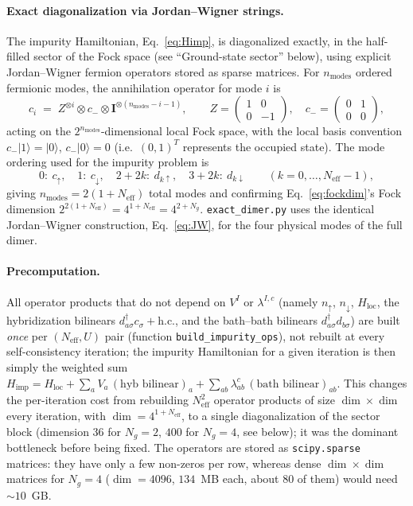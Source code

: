 \documentclass[11pt]{article}
\newcommand{\Neff}{N_{\mathrm{eff}}}
\newcommand{\Ng}{N_{g}}
\newcommand{\Himp}{H_{\mathrm{imp}}}
\newcommand{\Hloc}{H_{\mathrm{loc}}}
\begin{document}
\paragraph{Exact diagonalization via Jordan--Wigner strings.}
\label{sec:JW}
The impurity Hamiltonian, Eq.~\eqref{eq:Himp}, is diagonalized exactly, in the half-filled sector of the Fock space
(see ``Ground-state sector'' below), using explicit Jordan--Wigner fermion
operators stored as sparse matrices. For
$n_{\mathrm{modes}}$ ordered fermionic modes, the annihilation operator for
mode $i$ is
\begin{equation}
  c_i \;=\; Z^{\otimes i}\otimes c_{-}\otimes \mathbf{I}^{\otimes(n_{\mathrm{modes}}-i-1)},
  \qquad
  Z=\begin{pmatrix}1&0\\0&-1\end{pmatrix},\quad
  c_{-}=\begin{pmatrix}0&1\\0&0\end{pmatrix},
  \label{eq:JW}
\end{equation}
acting on the $2^{n_{\mathrm{modes}}}$-dimensional local Fock space, with the
local basis convention $c_{-}|1\rangle=|0\rangle$, $c_{-}|0\rangle=0$
(i.e.\ $(0,1)^{T}$ represents the occupied state). The mode ordering used for
the impurity problem is
\begin{equation}
  0:\ c_{\uparrow},\quad 1:\ c_{\downarrow},\quad
  2{+}2k:\ d_{k\uparrow},\quad 3{+}2k:\ d_{k\downarrow}
  \qquad (k=0,\dots,\Neff-1),
\end{equation}
giving $n_{\mathrm{modes}}=2(1+\Neff)$ total modes and confirming
Eq.~\eqref{eq:fockdim}'s Fock dimension $2^{2(1+\Neff)}=4^{1+\Neff}=4^{2+\Ng}$.
\texttt{exact\_dimer.py} uses the identical Jordan--Wigner construction,
Eq.~\eqref{eq:JW}, for the four physical modes of the full dimer.

\paragraph{Precomputation.} All operator products that do not depend on
$V^{I}$ or $\lambda^{I,c}$ (namely $n_\uparrow$, $n_\downarrow$, $\Hloc$, the
hybridization bilinears $d^\dagger_{a\sigma}c_\sigma+\mathrm{h.c.}$, and the
bath--bath bilinears $d^\dagger_{a\sigma}d_{b\sigma}$) are built \emph{once}
per $(\Neff,U)$ pair (function \texttt{build\_impurity\_ops}), not rebuilt at
every self-consistency iteration; the impurity Hamiltonian for a given
iteration is then simply the weighted sum
$\Himp = \Hloc + \sum_a V_a\,(\text{hyb bilinear})_a + \sum_{ab}\lambda^{c}_{ab}\,(\text{bath bilinear})_{ab}$.
This changes the per-iteration cost from rebuilding $\Neff^2$ operator
products of size $\dim\times\dim$ every iteration, with $\dim=4^{1+\Neff}$, to a
single diagonalization of the sector block (dimension $36$ for $\Ng=2$, $400$
for $\Ng=4$, see below); it was the dominant bottleneck before being fixed.
The operators are stored as \texttt{scipy.sparse} matrices: they have only a
few non-zeros per row, whereas dense $\dim\times\dim$ matrices for $\Ng=4$
($\dim=4096$, $134$~MB each, about $80$ of them) would need $\sim10$~GB.
\end{document}
